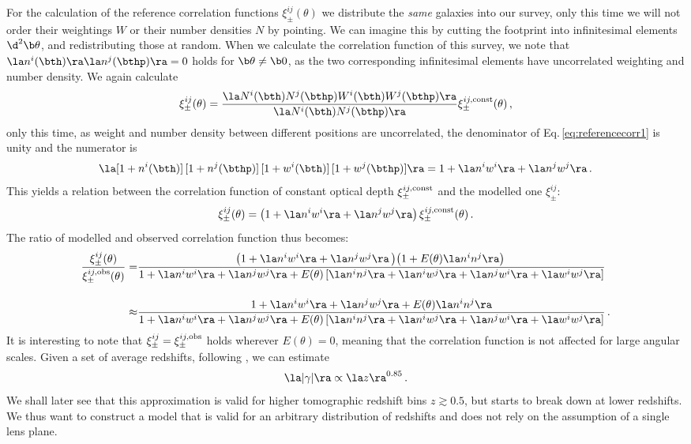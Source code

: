 For the calculation of the reference correlation functions $\xi_\pm^{ij}(\theta)$ we distribute the \textit{same} galaxies into our survey, only this time we will not order their weightings $W$ or their number densities $N$ by pointing. We can imagine this by cutting the footprint into infinitesimal elements $\d^2\b\theta$, and redistributing those at random. When we calculate the correlation function of this survey, we note that $\la n^i(\bth)\ra \la n^j(\bthp)\ra = 0$ holds for $\b\theta\neq \b 0$, as the two corresponding infinitesimal elements have uncorrelated weighting and number density. We again calculate \begin{align}
\xi^{ij}_\pm(\theta) = \frac{\la N^i(\bth)N^j(\bthp)W^i(\bth)W^j(\bthp)\ra}{\la N^i(\bth)N^j(\bthp)\ra} \xi_{\pm}^{ij,\rm{const}}(\theta) \, ,
 \label{eq:referencecorr1}
\end{align}
only this time, as weight and number density between different positions are uncorrelated, the denominator of Eq.\,\eqref{eq:referencecorr1} is unity and the numerator is \[
\la [1+n^i(\bth)]\,[1+n^j(\bthp)]\,[1+w^i(\bth)]\,[1+w^j(\bthp)]\ra = 1 + \la n^iw^i\ra + \la n^j w^j\ra\, .
\]
This yields a relation between the correlation function of constant optical depth $\xi_\pm^{ij,\rm{const}}$ and the modelled one $\xi_\pm^{ij}$:
\begin{equation}
\xi_\pm^{ij}(\theta) = \left(1+\la n^iw^i\ra + \la n^jw^j\ra \right)\xi_\pm^{ij,\rm{const}}(\theta)\, .
\end{equation}
The ratio of modelled and observed correlation function thus becomes: \begin{align}
\frac{\xi^{ij}_\pm(\theta)}{\xi_\pm^{ij,\rm{obs}}(\theta)} = & \frac{\left(1+\la n^iw^i\ra+\la n^jw^j\ra \left)\left(1+E(\theta)\la n^in^j\ra\right)\right.\right.}{1 + \la n^iw^i\ra + \la n^jw^j\ra + E(\theta)\left[\la n^in^j\ra + \la n^iw^j\ra + \la n^j w^i\ra + \la w^iw^j\ra\right]} \nonumber\\[10pt]
\approx & \frac{1+\la n^iw^i\ra+\la n^jw^j\ra + E(\theta)\la n^in^j\ra}{1 + \la n^iw^i\ra + \la n^jw^j\ra + E(\theta)\left[\la n^in^j\ra + \la n^iw^j\ra + \la n^j w^i\ra + \la w^iw^j\ra\right]}
\, .
\end{align}
It is interesting to note that $\xi^{ij}_\pm = \xi_\pm^{ij,\rm{obs}}$ holds wherever $E(\theta)=0$, meaning that the correlation function is not affected for large angular scales. Given a set of average redshifts, following \citet{2006APh....26...91V}, we can estimate 
\[
\la |\gamma| \ra \propto \la z \ra ^{0.85}\, .
\]
We shall later see that this approximation is valid for higher tomographic redshift bins $z\gtrsim 0.5$, but starts to break down at lower redshifts. We thus want to construct a model that is valid for an arbitrary distribution of redshifts and does not rely on the assumption of a single lens plane. 

